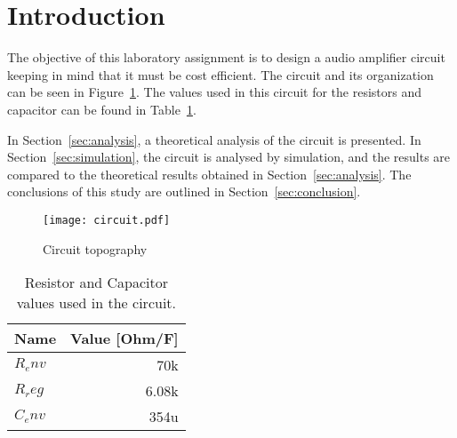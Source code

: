 \section{Introduction}
\label{sec:introduction}

\tab The objective of this laboratory assignment is to design a audio amplifier circuit keeping in mind that it must be cost efficient.
The circuit and its organization can be seen in Figure~\ref{fig:circuit}.
The values used in this circuit for the resistors and capacitor can be found in Table~\ref{tab:values}.

In Section~\ref{sec:analysis}, a theoretical analysis of the circuit is
presented. In Section~\ref{sec:simulation}, the circuit is analysed by
simulation, and the results are compared to the theoretical results obtained in
Section~\ref{sec:analysis}. The conclusions of this study are outlined in
Section~\ref{sec:conclusion}.
\\[1cm]
\begin{figure}[h] \centering
\texttt{[image: circuit.pdf]}
\caption{Circuit topography}
\label{fig:circuit}
\end{figure}

\begin{table}[H]
  \centering
  \begin{tabular}{|l|r|}
    \hline    
    {\bf Name} & {\bf Value [Ohm/F]} \\ \hline
    $R_env$ & 70k \\ \hline
    $R_reg$ & 6.08k \\ \hline
    $C_env$ & 354u \\ \hline	
  \end{tabular}
  \caption{Resistor and Capacitor values used in the circuit.}
  \label{tab:values}
\end{table}
